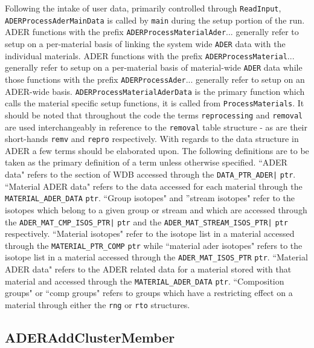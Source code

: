 Following the intake of user data, primarily controlled through \texttt{ReadInput},
\texttt{ADERProcessAderMainData} is called by \texttt{main} during the setup
portion of the run. ADER functions with the prefix
 \texttt{ADERProcessMaterialAder}...
generally refer to setup on a per-material basis of linking the system wide
\texttt{ADER} data with the individual materials. 
ADER functions with the prefix
 \texttt{ADERProcessMaterial}...
generally refer to setup on a per-material basis of material-wide \texttt{ADER}
data 
while those functions with the
prefix \texttt{ADERProcessAder}... generally refer to setup on an ADER-wide
basis. \texttt{ADERProcessMaterialAderData} is the primary function which calls
the material specific setup functions, it is called from \texttt{ProcessMaterials}.
It should be noted that throughout the code the terms \texttt{reprocessing} and
\texttt{removal} are used interchangeably in reference to the \texttt{removal}
table structure - as are their short-hands \texttt{remv} and \texttt{repro} 
respectively.
With regards to the data structure in ADER a few terms should be elaborated
upon. The following definitions are to be taken as the primary definition of a
term unless otherwise specified. ``ADER data" refers to the section
of WDB accessed through the \texttt{DATA\_PTR\_ADER|} \texttt{ptr}. 
``Material ADER data" refers to the data accessed for each material through the
\texttt{MATERIAL\_ADER\_DATA} \texttt{ptr}. ``Group isotopes" and ''stream
isotopes" refer to the isotopes which belong to a given group or stream and
which are accessed through the \texttt{ADER\_MAT\_CMP\_ISOS\_PTR|} \texttt{ptr}
and the \texttt{ADER\_MAT\_STREAM\_ISOS\_PTR|} \texttt{ptr} respectively. 
``Material isotopes" refer to the isotope list in a material accessed through
the \texttt{MATERIAL\_PTR\_COMP} \texttt{ptr} while ``material ader
isotopes" refers to the isotope list in a material accessed through the
\texttt{ADER\_MAT\_ISOS\_PTR} \texttt{ptr}. ``Material ADER data" refers
to the ADER related data for a material stored with that material and accessed
through the \texttt{MATERIAL\_ADER\_DATA} \texttt{ptr}. ``Composition
groups" or ``comp groups" refers to groups which have a restricting effect
on a material through either the \texttt{rng} or \texttt{rto} structures. 

\subsection{ADERAddClusterMember}


